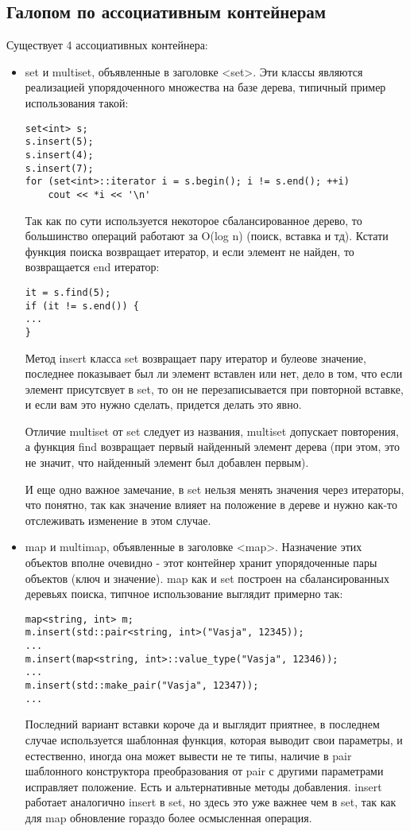 \subsection{Галопом по ассоциативным контейнерам}

Существует 4 ассоциативных контейнера:
\begin{itemize}
\item set и multiset, объявленные в заголовке <set>. Эти классы являются реализацией упорядоченного множества на базе дерева, типичный пример использования такой:
\begin{lstlisting}
set<int> s;
s.insert(5);
s.insert(4);
s.insert(7);
for (set<int>::iterator i = s.begin(); i != s.end(); ++i)
	cout << *i << '\n'
\end{lstlisting}
Так как по сути используется некоторое сбалансированное дерево, то большинство операций работают за O(log n) (поиск, вставка и тд). Кстати функция поиска возвращает
итератор, и если элемент не найден, то возвращается end итератор:
\begin{lstlisting}
it = s.find(5);
if (it != s.end()) {
...
}
\end{lstlisting}
Метод insert класса set возвращает пару итератор и булеове значение, последнее показывает был ли элемент вставлен или нет, дело в том, что если элемент присутсвует
в set, то он не перезаписывается при повторной вставке, и если вам это нужно сделать, придется делать это явно.

Отличие multiset от set следует из названия, multiset допускает повторения, а функция find возвращает первый найденный элемент дерева (при этом, это не
значит, что найденный элемент был добавлен первым).

И еще одно важное замечание, в set нельзя менять значения через итераторы, что понятно, так как значение влияет на положение в дереве и нужно как-то отслеживать
изменение в этом случае.

\item map и multimap, объявленные в заголовке <map>. Назначение этих объектов вполне очевидно - этот контейнер хранит упорядоченные пары объектов (ключ и значение).
map как и set построен на сбалансированных деревьях поиска, типчное использование выглядит примерно так:
\begin{lstlisting}
map<string, int> m;
m.insert(std::pair<string, int>("Vasja", 12345));
...
m.insert(map<string, int>::value_type("Vasja", 12346));
...
m.insert(std::make_pair("Vasja", 12347));
...
\end{lstlisting}
Последний вариант вставки короче да и выглядит приятнее, в последнем случае используется шаблонная функция, которая выводит свои параметры, и естественно,
иногда она может вывести не те типы, наличие в pair шаблонного конструктора преобразования от pair с другими параметрами исправляет положение.
Есть и альтернативные методы добавления. insert работает аналогично insert в set, но здесь это уже важнее чем в set, так как для map обновление гораздо
более осмысленная операция.


\end{itemize}
